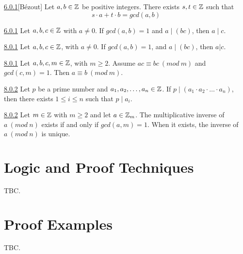 \documentclass[openany]{report}
\begin{document}
\begin{manualtheorem}{\hyperref[theorem6.0.1]{6.0.1}}[B\'ezout]
     Let $a,b \in \mathbb{Z}$ be positive integers. There exists $s,t \in \mathbb{Z}$ such that 
    $$s \cdot a + t \cdot b = gcd(a,b)$$
\end{manualtheorem}


\begin{manuallemma}{\hyperref[lemma6.0.1]{6.0.1}}
Let $a,b,c \in \mathbb{Z}$ with $a \neq 0$. If $gcd(a,b) = 1$ and $a \mid (bc)$, then $a \mid c$.
\end{manuallemma}

\begin{manuallemma}{\hyperref[lemma8.0.1]{8.0.1}}
    Let $a,b,c \in \mathbb{Z}$, with $a \neq 0$. If $gcd(a,b) = 1$, and $a \mid (bc)$, then $a|c$.

\end{manuallemma}

\begin{manualtheorem}{\hyperref[theorem8.0.1]{8.0.1}}
        Let $a,b,c,m \in \mathbb{Z}$, with $m \geq 2$. Assume $ac \equiv bc \ (mod \ m)$ and $gcd(c,m) = 1$. Then $a \equiv b \ (mod \ m)$.
\end{manualtheorem}

\begin{manuallemma}{\hyperref[lemma8.0.2]{8.0.2}}
        Let $p$ be a prime number and $a_1, a_2,\dots,a_n \in \mathbb{Z}$.
    If $p \mid (a_1 \cdot a_2 \cdot \dots \cdot a_n)$, then there exists $1 \leq i \leq n$ such that $p \mid a_i$.
\end{manuallemma}

\begin{manualtheorem}{\hyperref[theorem8.0.2]{8.0.2}}
        Let $m \in \mathbb{Z}$ with $m \geq 2$ and let $a \in \mathbb{Z}_m$. The multiplicative inverse of $a \ (mod \ n)$ exists if and only if $gcd(a,m) = 1$. When it exists, the inverse of  $a \ (mod \ n)$ is unique.
\end{manualtheorem}

\chapter{Logic and Proof Techniques}
TBC. 



\chapter{Proof Examples}
TBC.
\end{document}
